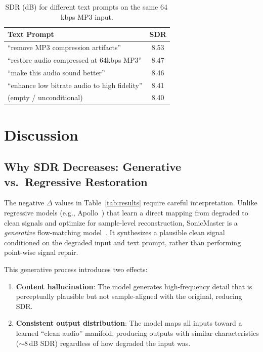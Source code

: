 \documentclass[conference]{IEEEtran}
\begin{document}
\begin{table}[t]
\centering
\caption{SDR (dB) for different text prompts on the same 64\,kbps MP3 input.}
\label{tab:prompts}
\begin{tabular}{lc}
\toprule
\textbf{Text Prompt} & \textbf{SDR} \\
\midrule
``remove MP3 compression artifacts''         & 8.53 \\
``restore audio compressed at 64kbps MP3''   & 8.47 \\
``make this audio sound better''             & 8.46 \\
``enhance low bitrate audio to high fidelity'' & 8.41 \\
(empty / unconditional)                      & 8.40 \\
\bottomrule
\end{tabular}
\end{table}

\section{Discussion}
\label{sec:discussion}

\subsection{Why SDR Decreases: Generative vs.\ Regressive Restoration}

The negative $\Delta$ values in Table~\ref{tab:results} require careful
interpretation. Unlike regressive models (e.g., Apollo~\cite{li2025apollo})
that learn a direct mapping from degraded to clean signals and optimize for
sample-level reconstruction, SonicMaster is a \emph{generative}
flow-matching model~\cite{lipman2023flow}. It synthesizes a plausible clean
signal conditioned on the degraded input and text prompt, rather than
performing point-wise signal repair.

This generative process introduces two effects:
\begin{enumerate}
    \item \textbf{Content hallucination}: The model generates high-frequency
    detail that is perceptually plausible but not sample-aligned with the
    original, reducing SDR.
    \item \textbf{Consistent output distribution}: The model maps all inputs
    toward a learned ``clean audio'' manifold, producing outputs with
    similar characteristics ($\sim$8\,dB SDR) regardless of how degraded the
    input was.
\end{enumerate}
\end{document}
